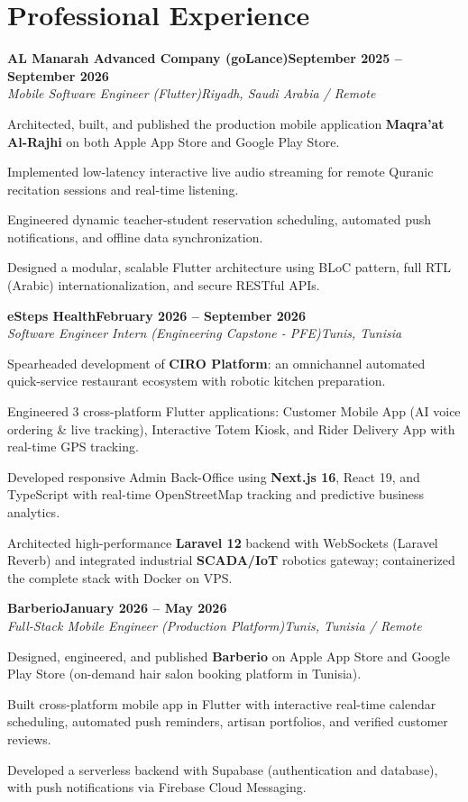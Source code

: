 \documentclass[letterpaper,10pt]{article}
\newcommand{\heading}[2]{\hspace{10pt}#1\hfill#2\\}
\newcommand{\headingBf}[2]{\heading{\textbf{#1}}{\textbf{#2}}}
\newcommand{\headingIt}[2]{\heading{\textit{#1}}{\textit{#2}}}
\newenvironment{resume_list}{
  \vspace{-7pt}
  \begin{itemize}[itemsep=-2pt, parsep=1pt, leftmargin=30pt]
}{
  \end{itemize}
}
\begin{document}
\section{Professional Experience}

\headingBf{AL Manarah Advanced Company (goLance)}{September 2025 -- September 2026}
\headingIt{Mobile Software Engineer (Flutter)}{Riyadh, Saudi Arabia / Remote}
\begin{resume_list}
  \item Architected, built, and published the production mobile application \textbf{Maqra'at Al-Rajhi} on both Apple App Store and Google Play Store.
  \item Implemented low-latency interactive live audio streaming for remote Quranic recitation sessions and real-time listening.
  \item Engineered dynamic teacher-student reservation scheduling, automated push notifications, and offline data synchronization.
  \item Designed a modular, scalable Flutter architecture using BLoC pattern, full RTL (Arabic) internationalization, and secure RESTful APIs.
\end{resume_list}

\headingBf{eSteps Health}{February 2026 -- September 2026}
\headingIt{Software Engineer Intern (Engineering Capstone - PFE)}{Tunis, Tunisia}
\begin{resume_list}
  \item Spearheaded development of \textbf{CIRO Platform}: an omnichannel automated quick-service restaurant ecosystem with robotic kitchen preparation.
  \item Engineered 3 cross-platform Flutter applications: Customer Mobile App (AI voice ordering \& live tracking), Interactive Totem Kiosk, and Rider Delivery App with real-time GPS tracking.
  \item Developed responsive Admin Back-Office using \textbf{Next.js 16}, React 19, and TypeScript with real-time OpenStreetMap tracking and predictive business analytics.
  \item Architected high-performance \textbf{Laravel 12} backend with WebSockets (Laravel Reverb) and integrated industrial \textbf{SCADA/IoT} robotics gateway; containerized the complete stack with Docker on VPS.
\end{resume_list}

\headingBf{Barberio}{January 2026 -- May 2026}
\headingIt{Full-Stack Mobile Engineer (Production Platform)}{Tunis, Tunisia / Remote}
\begin{resume_list}
  \item Designed, engineered, and published \textbf{Barberio} on Apple App Store and Google Play Store (on-demand hair salon booking platform in Tunisia).
  \item Built cross-platform mobile app in Flutter with interactive real-time calendar scheduling, automated push reminders, artisan portfolios, and verified customer reviews.
  \item Developed a serverless backend with Supabase (authentication and database), with push notifications via Firebase Cloud Messaging.
\end{resume_list}
\end{document}
